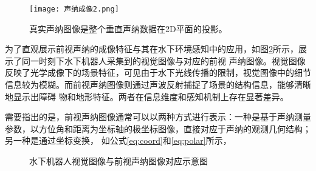 \begin{figure}[ht]
	\centering
	\texttt{[image: 声纳成像2.png]}
	\caption{真实声纳图像是整个垂直声纳数据在2D平面的投影。}
	\label{fig:声纳成像2}
\end{figure}

为了直观展示前视声纳的成像特征与其在水下环境感知中的应用，如图\ref{fig:水下机器人视觉图像与前视声纳图像对应示意图}所示，展示了同一时刻下水下机器人采集到的视觉图像与对应的前视
声纳图像。视觉图像反映了光学成像下的场景特征，可见由于水下光线传播的限制，视觉图像中的细节信息较为模糊。而前视声纳图像则通过声波反射捕捉了场景的结构信息，能够清晰地显示出障碍
物和地形特征。两者在信息维度和感知机制上存在显著差异。

需要指出的是，前视声纳图像通常可以以两种方式进行表示：一种是基于声纳测量参数，以方位角和距离为坐标轴的极坐标图像，直接对应于声纳的观测几何结构；另一种是通过坐标变换，
如公式\eqref{eq:coord}和\eqref{eq:polar}所示，


\begin{figure}[!ht]
	\centering
	\newsavebox{\standardbox}
  
	\begin{minipage}{\textwidth}
	  \centering
	  \hspace{1em}
	\end{minipage}
  
	\caption{水下机器人视觉图像与前视声纳图像对应示意图}
	\label{fig:水下机器人视觉图像与前视声纳图像对应示意图}
  \end{figure}



